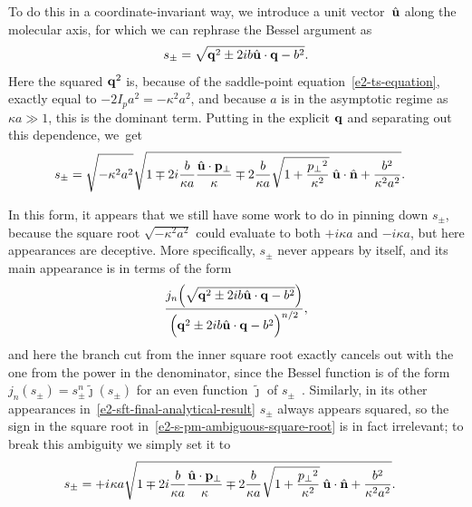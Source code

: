 To do this in a coordinate-invariant way, we introduce a unit vector~$\hat{\vb{u}}$ along the molecular axis, for which we can rephrase the Bessel argument as
\begin{equation}
s_\pm=\sqrt{\vb{q}^2\pm 2ib\hat{\vb{u}}\cdot\vb{q}-b^2}
.
\label{e2-s-pm-coordinate-free}
\end{equation}
Here the squared $\vb{q}^2$ is, because of the saddle-point equation~\eqref{e2-ts-equation}, exactly equal to $-2I_pa^2=-\kappa^2a^2$, and because $a$ is in the asymptotic regime as $\kappa a \gg 1$, this is the dominant term. Putting in the explicit $\vb{q}$ and separating out this dependence, we~get
\begin{align}
s_\pm
& =
\sqrt{
 -\kappa^2a^2
 \vphantom{\sqrt{\frac{\pt}{\kappa}}}
}
\sqrt{
 1
 \mp 2i \frac{b}{\kappa a} \frac{\uu\cdot\vbpo}{\kappa}
 \mp 2\frac{b}{\kappa a} \sqrt{1+\frac{\pt^2}{\kappa^2}}\:\uu\cdot\un
 + \frac{b^2}{\kappa^2 a^2}
}
.
\label{e2-s-pm-ambiguous-square-root}
\end{align}


In this form, it appears that we still have some work to do in pinning down $s_\pm$, because the square root $\sqrt{-\kappa^2 a^2}$ could evaluate to both $+i\kappa a$ and $-i\kappa a$, but here appearances are deceptive. More specifically, $s_\pm$ never appears by itself, and its main appearance is in terms of the form 
\begin{equation}
\frac{
j_n\mathopen{}\left(\sqrt{\vbq^2\pm 2ib\uu\cdot\vbq-b^2}\right)\mathclose{}
}{
\left(\vbq^2\pm 2ib\uu\cdot\vbq-b^2  \vphantom{\sqrt{q^2}} \right)^{n/2}
},
\end{equation}
and here the branch cut from the inner square root exactly cancels out with the one from the power in the denominator, since the Bessel function is of the form $j_n(s_\pm)=s_\pm^n\tilde{\jmath}(s_\pm)$ for an even function $\tilde{\jmath} $ of $s_\pm$~. Similarly, in its other appearances in~\eqref{e2-sft-final-analytical-result} $s_\pm$ always appears squared, so the sign in the square root in~\eqref{e2-s-pm-ambiguous-square-root} is in fact irrelevant; to break this ambiguity we simply set it to
\begin{align}
s_\pm
& =
+i \:\! \kappa a
\sqrt{
 1
 \mp 2i \frac{b}{\kappa a} \frac{\hat{\vb{u}}\cdot{\ensuremath{\vb{p}}_{\perp}}}{\kappa}
 \mp 2\frac{b}{\kappa a} \sqrt{1+\frac{{p_{\perp}}^2}{\kappa^2}}\:\hat{\vb{u}}\cdot\hat{\vb{n}}
 + \frac{b^2}{\kappa^2 a^2}
}
.
\label{e2-s-pm-unambiguous-square-root}
\end{align}

